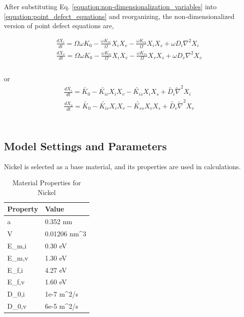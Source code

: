 \documentclass[a4paper]{article}
\begin{document}
After substituting Eq. \ref{equation:non-dimensionalization_variables} into \ref{equation:point_defect_equations} and reorganizing, the non-dimensionalized version of point defect equations are,

\begin{equation}
  \begin{aligned}
    &\frac{dX_i}{dt} = \Omega\omega K_0 - \frac{\omega K_{iv}}{\Omega}X_iX_v - \frac{\omega K_{is}}{\Omega}X_iX_s + \omega D_i\nabla^2 X_i\\
    &\frac{dX_v}{dt} = \Omega\omega K_0 - \frac{\omega K_{iv}}{\Omega}X_iX_v - \frac{\omega K_{vs}}{\Omega}X_vX_s + \omega D_v\nabla^2 X_v\\
  \end{aligned}
  \label{equation:non-dimensionalized_point_defect_equations}
\end{equation}\\
or
\begin{equation}
  \begin{aligned}
    &\frac{dX_i}{dt} = \widetilde{K_0} - \widetilde{K_{iv}}X_iX_v - \widetilde{K_{is}}X_iX_s + \widetilde{D_i}\widetilde{\nabla}^2 X_i\\
    &\frac{dX_v}{dt} = \widetilde{K_0} - \widetilde{K_{iv}}X_iX_v - \widetilde{K_{vs}}X_vX_s + \widetilde{D_v}\widetilde{\nabla}^2 X_v\\
  \end{aligned}
  \label{equation:non-dimensionalized_point_defect_equations}
\end{equation}\\

\subsection{Model Settings and Parameters} \hspace{10pt}
Nickel is selected as a base material, and its properties are used in calculations.

\begin{table}[h!]
  \centering
  \caption{Material Properties for Nickel\cite{walgraef1996}}
  \label{table:Ni_material_properties}
  \begin{tabular}{ ||p{2cm}|p{2cm}||  }
     \hline
     Property & Value\\
     \hline\hline
     a  & 0.352 nm\\
     V  & 0.01206 nm^3\\
     E_{m,i}  & 0.30 eV\\
     E_{m,v}  & 1.30 eV\\
     E_{f,i}  & 4.27 eV\\
     E_{f,v}  & 1.60 eV\\
     D_{0,i}  & 1e-7 m^2/s\\
     D_{0,v}  & 6e-5 m^2/s\\

     \hline
  \end{tabular}
\end{table}
\end{document}
